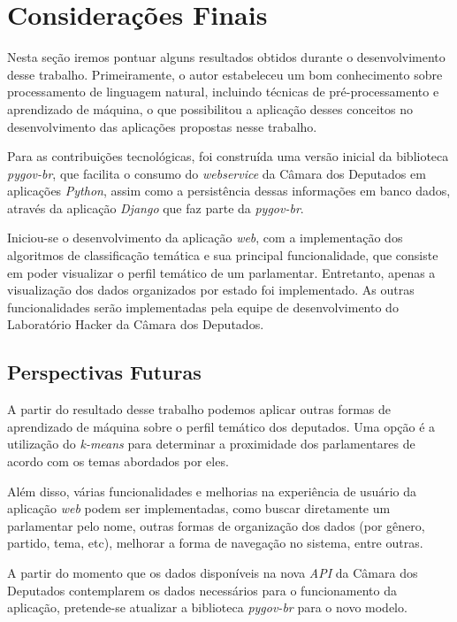 \chapter{Considerações Finais}

Nesta seção iremos pontuar alguns resultados obtidos durante o desenvolvimento desse trabalho. Primeiramente, o autor estabeleceu um bom conhecimento sobre processamento de linguagem natural, incluindo técnicas de pré-processamento e aprendizado de máquina, o que possibilitou a aplicação desses conceitos no desenvolvimento das aplicações propostas nesse trabalho.

Para as contribuições tecnológicas, foi construída uma versão inicial da biblioteca \textit{pygov-br}, que facilita o consumo do \textit{webservice} da Câmara dos Deputados em aplicações \textit{Python}, assim como a persistência dessas informações em banco dados, através da aplicação \textit{Django} que faz parte da \textit{pygov-br}.

Iniciou-se o desenvolvimento da aplicação \textit{web}, com a implementação dos algoritmos de classificação temática e sua principal funcionalidade, que consiste em poder visualizar o perfil temático de um parlamentar. Entretanto, apenas a visualização dos dados organizados por estado foi implementado. As outras funcionalidades serão implementadas pela equipe de desenvolvimento do Laboratório Hacker da Câmara dos Deputados.

\section{Perspectivas Futuras}

A partir do resultado desse trabalho podemos aplicar outras formas de aprendizado de máquina sobre o perfil temático dos deputados. Uma opção é a utilização do \textit{k-means} para determinar a proximidade dos parlamentares de acordo com os temas abordados por eles.

Além disso, várias funcionalidades e melhorias na experiência de usuário da aplicação \textit{web} podem ser implementadas, como buscar diretamente um parlamentar pelo nome, outras formas de organização dos dados (por gênero, partido, tema, etc), melhorar a forma de navegação no sistema, entre outras.

A partir do momento que os dados disponíveis na nova \textit{API} da Câmara dos Deputados contemplarem os dados necessários para o funcionamento da aplicação, pretende-se atualizar a biblioteca \textit{pygov-br} para o novo modelo.
